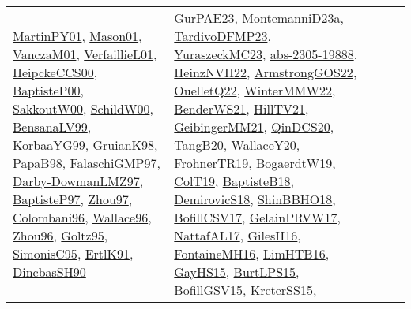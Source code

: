 {\begin{longtable}{lp{3cm}>{\raggedright}p{6cm}>{\raggedright}p{6cm}p{8cm}}
\href{articles/MartinPY01.pdf}{MartinPY01}\cite{MartinPY01}, \href{articles/Mason01.pdf}{Mason01}\cite{Mason01}, \href{papers/VanczaM01.pdf}{VanczaM01}\cite{VanczaM01}, \href{papers/VerfaillieL01.pdf}{VerfaillieL01}\cite{VerfaillieL01}, \href{articles/HeipckeCCS00.pdf}{HeipckeCCS00}\cite{HeipckeCCS00}, \href{articles/BaptisteP00.pdf}{BaptisteP00}\cite{BaptisteP00}, \href{articles/SakkoutW00.pdf}{SakkoutW00}\cite{SakkoutW00}, \href{articles/SchildW00.pdf}{SchildW00}\cite{SchildW00}, \href{articles/BensanaLV99.pdf}{BensanaLV99}\cite{BensanaLV99}, \href{papers/KorbaaYG99.pdf}{KorbaaYG99}\cite{KorbaaYG99}, \href{papers/GruianK98.pdf}{GruianK98}\cite{GruianK98}, \href{articles/PapaB98.pdf}{PapaB98}\cite{PapaB98}, \href{articles/FalaschiGMP97.pdf}{FalaschiGMP97}\cite{FalaschiGMP97}, \href{articles/Darby-DowmanLMZ97.pdf}{Darby-DowmanLMZ97}\cite{Darby-DowmanLMZ97}, \href{papers/BaptisteP97.pdf}{BaptisteP97}\cite{BaptisteP97}, \href{articles/Zhou97.pdf}{Zhou97}\cite{Zhou97}, \href{papers/Colombani96.pdf}{Colombani96}\cite{Colombani96}, \href{articles/Wallace96.pdf}{Wallace96}\cite{Wallace96}, \href{papers/Zhou96.pdf}{Zhou96}\cite{Zhou96}, \href{papers/Goltz95.pdf}{Goltz95}\cite{Goltz95}, \href{papers/SimonisC95.pdf}{SimonisC95}\cite{SimonisC95}, \href{papers/ErtlK91.pdf}{ErtlK91}\cite{ErtlK91}, \href{articles/DincbasSH90.pdf}{DincbasSH90}\cite{DincbasSH90} & \href{articles/GurPAE23.pdf}{GurPAE23}\cite{GurPAE23}, \href{articles/MontemanniD23a.pdf}{MontemanniD23a}\cite{MontemanniD23a}, \href{papers/TardivoDFMP23.pdf}{TardivoDFMP23}\cite{TardivoDFMP23}, \href{papers/YuraszeckMC23.pdf}{YuraszeckMC23}\cite{YuraszeckMC23}, \href{articles/abs-2305-19888.pdf}{abs-2305-19888}\cite{abs-2305-19888}, \href{articles/HeinzNVH22.pdf}{HeinzNVH22}\cite{HeinzNVH22}, \href{papers/ArmstrongGOS22.pdf}{ArmstrongGOS22}\cite{ArmstrongGOS22}, \href{papers/OuelletQ22.pdf}{OuelletQ22}\cite{OuelletQ22}, \href{papers/WinterMMW22.pdf}{WinterMMW22}\cite{WinterMMW22}, \href{papers/BenderWS21.pdf}{BenderWS21}\cite{BenderWS21}, \href{papers/HillTV21.pdf}{HillTV21}\cite{HillTV21}, \href{papers/GeibingerMM21.pdf}{GeibingerMM21}\cite{GeibingerMM21}, \href{articles/QinDCS20.pdf}{QinDCS20}\cite{QinDCS20}, \href{papers/TangB20.pdf}{TangB20}\cite{TangB20}, \href{articles/WallaceY20.pdf}{WallaceY20}\cite{WallaceY20}, \href{papers/FrohnerTR19.pdf}{FrohnerTR19}\cite{FrohnerTR19}, \href{papers/BogaerdtW19.pdf}{BogaerdtW19}\cite{BogaerdtW19}, \href{papers/ColT19.pdf}{ColT19}\cite{ColT19}, \href{articles/BaptisteB18.pdf}{BaptisteB18}\cite{BaptisteB18}, \href{papers/DemirovicS18.pdf}{DemirovicS18}\cite{DemirovicS18}, \href{articles/ShinBBHO18.pdf}{ShinBBHO18}\cite{ShinBBHO18}, \href{papers/BofillCSV17.pdf}{BofillCSV17}\cite{BofillCSV17}, \href{papers/GelainPRVW17.pdf}{GelainPRVW17}\cite{GelainPRVW17}, \href{articles/NattafAL17.pdf}{NattafAL17}\cite{NattafAL17}, \href{papers/GilesH16.pdf}{GilesH16}\cite{GilesH16}, \href{papers/FontaineMH16.pdf}{FontaineMH16}\cite{FontaineMH16}, \href{papers/LimHTB16.pdf}{LimHTB16}\cite{LimHTB16}, \href{papers/GayHS15.pdf}{GayHS15}\cite{GayHS15}, \href{papers/BurtLPS15.pdf}{BurtLPS15}\cite{BurtLPS15}, \href{papers/BofillGSV15.pdf}{BofillGSV15}\cite{BofillGSV15}, \href{papers/KreterSS15.pdf}{KreterSS15}\cite{KreterSS15}, 
\end{longtable}}
